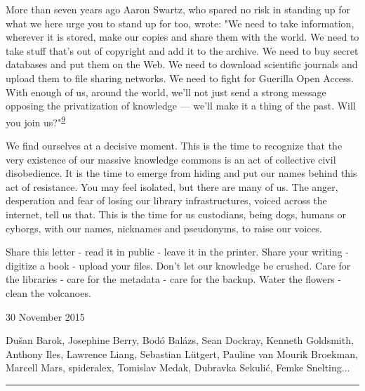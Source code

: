 \documentclass[11pt,a4paper]{article}
\begin{document}
More than seven years ago Aaron Swartz, who spared no risk in standing
up for what we here urge you to stand up for too, wrote: {"We need to
take information, wherever it is stored, make our copies and share them
with the world. We need to take stuff that's out of copyright and add it
to the archive. We need to buy secret databases and put them on the Web.
We need to download scientific journals and upload them to file sharing
networks. We need to fight for Guerilla Open Access. With enough of us,
around the world, we'll not just send a strong message opposing the
privatization of knowledge --- we'll make it a thing of the past. Will
you join us?"}\textsuperscript{\protect\hyperlink{fn-9}{9}}

We find ourselves at a decisive moment. This is the time to recognize
that the very existence of our massive knowledge commons is an act of
collective civil disobedience. It is the time to emerge from hiding and
put our names behind this act of resistance. You may feel isolated, but
there are many of us. The anger, desperation and fear of losing our
library infrastructures, voiced across the internet, tell us that. This
is the time for us custodians, being dogs, humans or cyborgs, with our
names, nicknames and pseudonyms, to raise our voices.

Share this letter - read it in public - leave it in the printer. Share
your writing - digitize a book - upload your files. Don't let our
knowledge be crushed. Care for the libraries - care for the metadata -
care for the backup. Water the flowers - clean the volcanoes.

30 November 2015

Dušan Barok, Josephine Berry, Bodó Balázs, Sean Dockray, Kenneth
Goldsmith, Anthony Iles, Lawrence Liang, Sebastian Lütgert, Pauline van
Mourik Broekman, Marcell Mars, spideralex, Tomislav Medak, Dubravka
Sekulić, Femke Snelting...

\begin{center}\rule{0.5\linewidth}{\linethickness}\end{center}
\end{document}
